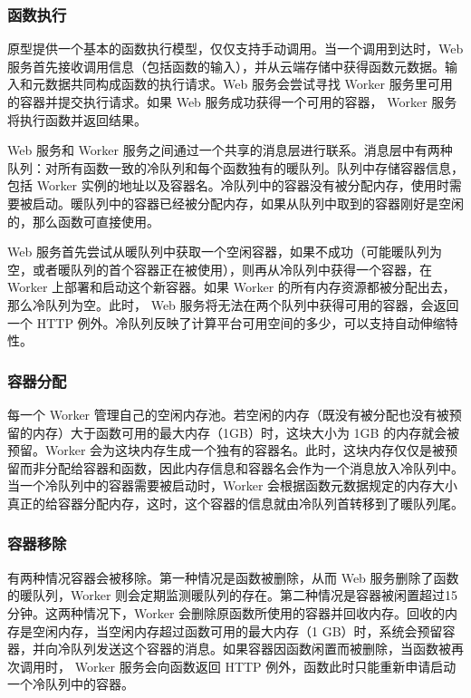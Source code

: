\documentclass[11pt]{article}
\begin{document}
\subsubsection{函数执行}
原型提供一个基本的函数执行模型，仅仅支持手动调用。当一个调用到达时，Web 服务首先接收调用信息（包括函数的输入），并从云端存储中获得函数元数据。输入和元数据共同构成函数的执行请求。Web 服务会尝试寻找 Worker 服务里可用的容器并提交执行请求。如果 Web 服务成功获得一个可用的容器， Worker 服务将执行函数并返回结果。


Web 服务和 Worker 服务之间通过一个共享的消息层进行联系。消息层中有两种队列：对所有函数一致的冷队列和每个函数独有的暖队列。队列中存储容器信息，包括 Worker 实例的地址以及容器名。冷队列中的容器没有被分配内存，使用时需要被启动。暖队列中的容器已经被分配内存，如果从队列中取到的容器刚好是空闲的，那么函数可直接使用。


Web 服务首先尝试从暖队列中获取一个空闲容器，如果不成功（可能暖队列为空，或者暖队列的首个容器正在被使用），则再从冷队列中获得一个容器，在 Worker 上部署和启动这个新容器。如果 Worker 的所有内存资源都被分配出去，那么冷队列为空。此时， Web 服务将无法在两个队列中获得可用的容器，会返回一个 HTTP 例外。冷队列反映了计算平台可用空间的多少，可以支持自动伸缩特性。

\subsubsection{容器分配}
每一个 Worker 管理自己的空闲内存池。若空闲的内存（既没有被分配也没有被预留的内存）大于函数可用的最大内存（1GB）时，这块大小为 1GB 的内存就会被预留。Worker 会为这块内存生成一个独有的容器名。此时，这块内存仅仅是被预留而非分配给容器和函数，因此内存信息和容器名会作为一个消息放入冷队列中。当一个冷队列中的容器需要被启动时，Worker 会根据函数元数据规定的内存大小真正的给容器分配内存，这时，这个容器的信息就由冷队列首转移到了暖队列尾。

\subsubsection{容器移除}
有两种情况容器会被移除。第一种情况是函数被删除，从而 Web 服务删除了函数的暖队列，Worker 则会定期监测暖队列的存在。第二种情况是容器被闲置超过15分钟。这两种情况下，Worker 会删除原函数所使用的容器并回收内存。回收的内存是空闲内存，当空闲内存超过函数可用的最大内存（1 GB）时，系统会预留容器，并向冷队列发送这个容器的消息。如果容器因函数闲置而被删除，当函数被再次调用时， Worker 服务会向函数返回 HTTP 例外，函数此时只能重新申请启动一个冷队列中的容器。
\end{document}
